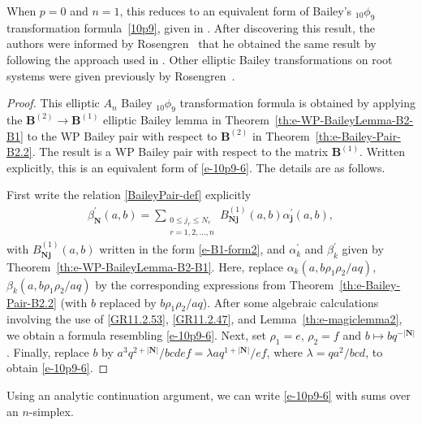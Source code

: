 \documentclass[pdftex]{sigma}
\numberwithin{equation}{section}
\newenvironment{Remark*}{\begin{remark*}\normalfont}{\end{remark*}}
\newcommand{\sumN}{{\left| \boldsymbol{N} \right|}}
\newcommand{\B}{{ \mathbf B}}
\newcommand{\N}{{ \boldsymbol N}}
\renewcommand{\j}{{ \boldsymbol{j}}}
\newcommand{\multsum}[3]{{\sum\limits_{\substack{{0\le #1_#3 \le #2_#3} \\
{#3 =1,2,\dots, n}}}}}
\begin{document}
\begin{Remark*} When $p=0$ and $n=1$, this reduces to an equivalent form of Bailey's $_{10}\phi_9$ transformation formula~\eqref{10p9}, given in \cite[equation~(2.9.1)]{GR90}. After discovering this result, the authors were informed by Rosengren~\cite{HR-PC-2016} that he obtained the same result by following the approach used in \cite{BS1998, HR2004}. Other elliptic Bailey transformations on root systems were given previously by Rosengren~\cite{HR2004, HR2017a}.
\end{Remark*}
\begin{proof} This elliptic $A_n$ Bailey $_{10}\phi_9$ transformation formula is obtained by applying the $\B^{(2)} \to\B^{(1)}$ elliptic Bailey lemma in Theo\-rem~\ref{th:e-WP-BaileyLemma-B2-B1} to the WP Bailey pair with respect to $\B^{(2)}$ in Theo\-rem~\ref{th:e-Bailey-Pair-B2.2}. The result is a WP Bailey pair with respect to the matrix $\B^{(1)}$. Written explicitly, this is an equivalent form of \eqref{e-10p9-6}. The details are as follows.

First write the relation \eqref{BaileyPair-def} explicitly
\begin{gather*}%
\beta^{\prime}_\N(a,b) = \multsum{j}{N}{r} B^{(1)}_{\N\j}(a,b) \alpha^{\prime}_{\j} (a,b),
\end{gather*}
with $B^{(1)}_{\N\j}(a,b)$ written in the form \eqref{e-B1-form2}, and $\alpha^{\prime}_k$ and $\beta^{\prime}_k$ given by Theorem~\ref{th:e-WP-BaileyLemma-B2-B1}. Here,
replace $\alpha_k(a, b\rho_1\rho_2/aq) $,
$\beta_k(a, b\rho_1\rho_2/aq)$ by the corresponding expressions from Theorem~\ref{th:e-Bailey-Pair-B2.2} (with $b$ replaced by $b\rho_1\rho_2/aq$). After some algebraic calculations involving the use of \eqref{GR11.2.53}, \eqref{GR11.2.47},
and Lemma~\ref{th:e-magiclemma2},
 we obtain a formula resembling \eqref{e-10p9-6}.
Next, set $\rho_1=e$, $\rho_2=f$ and $b\mapsto bq^{-\sumN}$. Finally, replace $b$ by $a^3q^{2+\sumN}/bcdef = \lambda a q^{1+\sumN}/ef$, where $\lambda = qa^2/bcd$, to obtain \eqref{e-10p9-6}.
\end{proof}

Using an analytic continuation argument, we can write \eqref{e-10p9-6} with sums over an $n$-simplex.
\end{document}
